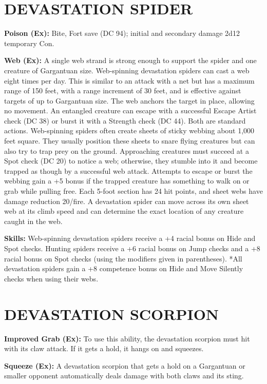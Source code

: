 \documentclass{article}
\begin{document}
\section*{DEVASTATION SPIDER }

\textbf{Poison (Ex):} Bite, Fort save (DC 94); initial and secondary damage 2d12 
temporary Con. 

\textbf{Web (Ex):} A single web strand is strong enough to support the spider and 
one creature of Gargantuan size. Web-spinning devastation spiders can cast a web 
eight times per day. This is similar to an attack with a net but has a maximum 
range of 150 feet, with a range increment of 30 feet, and is effective against 
targets of up to Gargantuan size. The web anchors the target in place, allowing 
no movement. An entangled creature can escape with a successful Escape Artist check 
(DC 38) or burst it with a Strength check (DC 44). Both are standard actions. Web-spinning 
spiders often create sheets of sticky webbing about 1,000 feet square. They usually 
position these sheets to snare flying creatures but can also try to trap prey on 
the ground. Approaching creatures must succeed at a Spot check (DC 20) to notice 
a web; otherwise, they stumble into it and become trapped as though by a successful 
web attack. Attempts to escape or burst the webbing gain a +5 bonus if the trapped 
creature has something to walk on or grab while pulling free. Each 5-foot section 
has 24 hit points, and sheet webs have damage reduction 20/fire. A devastation 
spider can move across its own sheet web at its climb speed and can determine the 
exact location of any creature caught in the web. 

\textbf{Skills:} Web-spinning devastation spiders receive a +4 racial bonus on 
Hide and Spot checks. Hunting spiders receive a +6 racial bonus on Jump checks 
and a +8 racial bonus on Spot checks (using the modifiers given in parentheses). 
*All devastation spiders gain a +8 competence bonus on Hide and Move Silently checks 
when using their webs. 

\section*{DEVASTATION SCORPION }

\textbf{Improved Grab (Ex):} To use this ability, the devastation scorpion must 
hit with its claw attack. If it gets a hold, it hangs on and squeezes. 

\textbf{Squeeze (Ex):} A devastation scorpion that gets a hold on a Gargantuan 
or smaller opponent automatically deals damage with both claws and its sting. 
\end{document}
